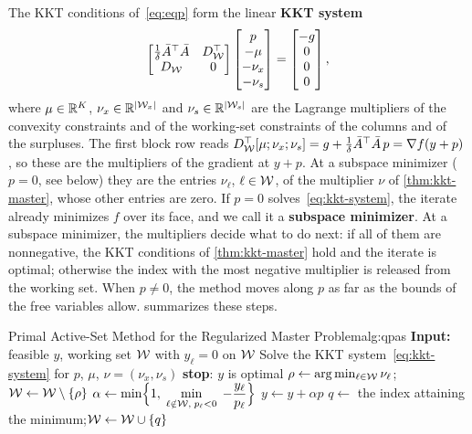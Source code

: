 The KKT conditions of~\eqref{eq:eqp} form the linear \textbf{KKT system}
\begin{equation} \label{eq:kkt-system}
\begin{bmatrix} \frac{1}{\delta}\bar{A}^\top\bar{A} & D_{\mathcal{W}}^\top\\ D_{\mathcal{W}} & 0\end{bmatrix}
\begin{bmatrix} p\\ -\mu\\ -\nu_x\\ -\nu_s\end{bmatrix}
= \begin{bmatrix} -g\\ 0\\ 0\\ 0\end{bmatrix},
\end{equation}
where $\mu\in\mathbb{R}^K$, $\nu_x\in\mathbb{R}^{|\mathcal{W}_x|}$ and $\nu_s\in\mathbb{R}^{|\mathcal{W}_s|}$ are the Lagrange
multipliers of the convexity constraints and of the working-set constraints of the columns
and of the surpluses. The first block row reads
$D_{\mathcal{W}}^\top[\mu;\nu_x;\nu_s] = g + \frac{1}{\delta}\bar{A}^\top\bar{A}\,p = \nabla f(y+p)$, so these are
the multipliers of the gradient at $y+p$. At a subspace minimizer ($p=0$, see below) they are the
entries $\nu_\ell$, $\ell\in\mathcal{W}$, of the multiplier $\nu$ of \cref{thm:kkt-master}, whose other
entries are zero. If $p = 0$ solves~\eqref{eq:kkt-system}, the iterate already minimizes
$f$ over its face, and we call it a \textbf{subspace minimizer}. At a subspace minimizer, the
multipliers decide what to do next: if all of them are nonnegative, the KKT conditions of
\cref{thm:kkt-master} hold and the iterate is optimal; otherwise the index with the most
negative multiplier is released from the working set. When $p\ne0$, the method moves along
$p$ as far as the bounds of the free variables allow.  summarizes these steps.

\begin{algobox}{Primal Active-Set Method for the Regularized Master Problem}{alg:qpas}
\State \textbf{Input:} feasible $y$, working set $\mathcal{W}$ with $y_\ell = 0$ on $\mathcal{W}$
\Repeat
    \State Solve the KKT system~\eqref{eq:kkt-system} for $p$, $\mu$, $\nu = (\nu_x,\nu_s)$
            \State \textbf{stop}: $y$ is optimal
        \Else
            \State $\rho\gets\arg\min_{\ell\in\mathcal{W}}\nu_\ell$;\quad $\mathcal{W}\gets\mathcal{W}\setminus\{\rho\}$
        \EndIf
    \Else
        \State $\alpha\gets\min\Bigl\{1,\;\min\limits_{\ell\notin\mathcal{W},\;p_\ell<0}\;
               -\dfrac{y_\ell}{p_\ell}\Bigr\}$ 
        \State $y\gets y+\alpha p$
            \State $q\gets$ the index attaining the minimum;\quad $\mathcal{W}\gets\mathcal{W}\cup\{q\}$
        \EndIf
    \EndIf
{}
\end{algobox}


